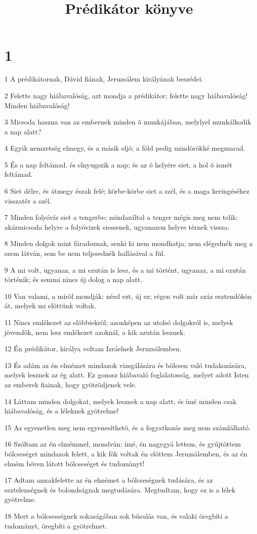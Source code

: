 

\title{Prédikátor könyve}


\chapter{1}

\par 1 A prédikátornak, Dávid fiának, Jeruzsálem  királyának beszédei.
\par 2 Felette nagy hiábavalóság, azt mondja a prédikátor; felette nagy hiábavalóság! Minden hiábavalóság!
\par 3 Micsoda haszna van az embernek minden õ munkájában, melylyel munkálkodik a nap alatt?
\par 4 Egyik nemzetség elmegy, és a másik eljõ; a föld pedig mindörökké megmarad.
\par 5 És a nap feltámad, és elnyugszik a nap; és az õ helyére siet, a hol õ ismét feltámad.
\par 6 Siet délre, és átmegy észak felé; körbe-körbe siet a szél, és a maga keringéséhez visszatér a szél.
\par 7 Minden folyóvíz siet a tengerbe; mindazáltal a tenger mégis meg nem telik: akármicsoda helyre a folyóvizek siessenek, ugyanazon helyre térnek vissza.
\par 8 Minden dolgok mint fáradoznak, senki ki nem mondhatja; nem elégednék meg a szem látván, sem be nem teljesednék hallásával a fül.
\par 9 A mi volt, ugyanaz, a mi ezután is lesz, és a mi történt, ugyanaz, a mi ezután történik; és semmi nincs új dolog a nap alatt.
\par 10 Van valami, a mirõl mondják: nézd ezt, új ez; régen volt már száz esztendõkön át, melyek mi elõttünk voltak.
\par 11 Nincs emlékezet az elõbbiekrõl; azonképen az utolsó dolgokról is, melyek jövendõk, nem lesz emlékezet azoknál, a kik azután lesznek.
\par 12 Én prédikátor, királya voltam Izráelnek Jeruzsálemben.
\par 13 És adám az én elmémet mindazok vizsgálására és bölcsen való tudakozására, melyek lesznek az ég alatt. Ez gonosz hiábavaló foglalatosság, melyet adott Isten az emberek fiainak, hogy gyötrõdjenek vele.
\par 14 Láttam minden dolgokat, melyek lesznek a nap alatt, és ímé minden csak hiábavalóság, és a léleknek gyötrelme!
\par 15 Az egyenetlen meg nem egyenesíthetõ, és a fogyatkozás meg nem számlálható.
\par 16 Szóltam az én elmémmel, mondván: ímé, én nagygyá lettem, és gyûjtöttem bölcseséget mindazok felett, a kik fõk voltak én elõttem Jeruzsálemben, és az én elmém bõven látott bölcseséget és tudományt!
\par 17 Adtam annakfelette az én elmémet a bölcseségnek tudására, és az esztelenségnek és bolondságnak megtudására. Megtudtam, hogy ez is a lélek  gyötrelme.
\par 18 Mert a bölcsességnek sokaságában sok búsulás van, és valaki öregbíti a tudományt, öregbíti a gyötrelmet.

